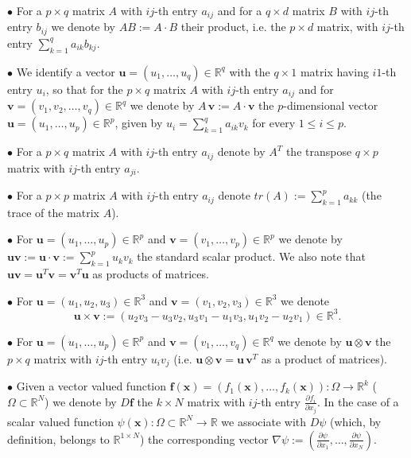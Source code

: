 \documentclass{article}
\theoremstyle{definition}
\theoremstyle{remark}
\renewcommand{\O}{\Omega}
\renewcommand{\vec}[1]{\mathbf{#1}}
\newcommand{\R}{\mathbb{R}}
\renewcommand{\O}{\Omega}
\renewcommand{\O}{\Omega}
\newcommand{\R}{{\mathbb{R}}}
\begin{document}
\noindent$\bullet$ For a $p\times q$ matrix $A$ with $ij$-th entry
$a_{ij}$ and for a $q\times d$ matrix $B$ with $ij$-th entry
$b_{ij}$ we denote by $AB:=A\cdot B$ their product, i.e. the
$p\times d$ matrix, with $ij$-th entry
$\sum\limits_{k=1}^{q}a_{ik}b_{kj}$.

\noindent$\bullet$ We identify a vector $\vec
u=(u_1,\ldots,u_q)\in\R^q$ with the $q\times 1$ matrix
having $i1$-th entry $u_i$, so that for the $p\times q$ matrix $A$
with $ij$-th entry $a_{ij}$ and for $\vec
v=(v_1,v_2,\ldots,v_q)\in\R^q$ we denote by $A\,\vec v :=A\cdot\vec
v$ the $p$-dimensional vector $\vec u=(u_1,\ldots,u_p)\in\R^p$,
given by $u_i=\sum\limits_{k=1}^{q}a_{ik}v_k$ for every $1\leq i\leq
p$.

\noindent$\bullet$ For a $p\times q$ matrix $A$ with $ij$-th entry
$a_{ij}$ denote by $A^T$ the transpose $q\times p$ matrix with
$ij$-th entry $a_{ji}$.

\noindent$\bullet$ For a $p\times p$ matrix $A$ with $ij$-th entry
$a_{ij}$ denote $tr(A):=\sum_{k=1}^{p}a_{kk}$ (the trace of the
matrix $A$).

\noindent$\bullet$ For $\vec u=(u_1,\ldots,u_p)\in\R^p$ and $\vec
v=(v_1,\ldots,v_p)\in\R^p$ we denote by $\vec u\vec v:=\vec
u\cdot\vec v:=\sum\limits_{k=1}^{p}u_k v_k$ the standard scalar
product. We also note that $\vec u\vec v=\vec u^T\vec v=\vec v^T\vec
u$ as products of matrices.

\noindent$\bullet$ For $\vec u=(u_1,u_2,u_3)\in\R^3$ and $\vec
v=(v_1,v_2,v_3)\in\R^3$ we denote
$$\vec u\times\vec v:=
\left(u_2 v_3-u_3 v_2, u_3 v_1-u_1 v_3, u_1 v_2-u_2
v_1\right)\in\R^3.$$

\noindent$\bullet$ For $\vec u=(u_1,\ldots,u_p)\in\R^p$ and $\vec
v=(v_1,\ldots,v_q)\in\R^q$ we denote by $\vec u\otimes\vec v$ the
$p\times q$ matrix with $ij$-th entry $u_i v_j$ (i.e. $\vec
u\otimes\vec v=\vec u\,\vec v^T$ as a product of matrices).

\noindent$\bullet$
Given a vector valued function $\vec f(\vec x)=\left(f_1(\vec
x),\ldots,f_k(\vec x)\right):\O\to\R^k$ ($\O\subset\R^N$) we denote
by $D\vec f$ the $k\times N$ matrix with $ij$-th entry
$\frac{\partial f_i}{\partial x_j}$. In the case of a scalar valued
function $\psi(\vec x):\O\subset\R^N\to\R$ we associate with $D
\psi$ (which, by definition, belongs to $\R^{1\times N}$) the
corresponding vector $\nabla \psi:=\left(\frac{\partial
\psi}{\partial x_1},\ldots,\frac{\partial \psi}{\partial
x_N}\right)$.
\end{document}

